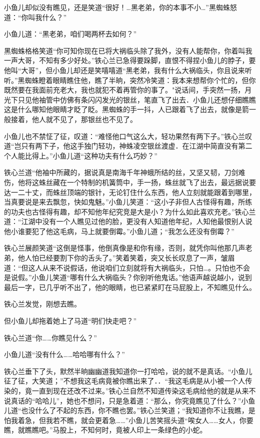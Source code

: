 \documentclass[12pt,oneside]{book}
\begin{document}
小鱼儿却似没有瞧见，还是笑道``很好！\ldots 黑老弟，你的本事不小\ldots{}''黑蜘蛛怒道：``你叫我什么？''

小鱼儿道：``黑老弟，咱们喝两杯去如何？''

黑蜘蛛格格笑道``你可知你现在已将大祸临头除了我外，没有人能帮你，你着叫我一声大哥，不知有多少好处。''铁心兰已急得要跺脚，直恨不得捏小鱼儿的脖子，要他叫``大哥''，但小鱼儿却还是笑嘻嘻道``黑老弟，我有什么大祸临头，你且说来听听。''黑蜘蛛瞪着眼睛瞧住他，瞧了半晌，突然冷笑道：我本来想帮你个忙的，但你既然要在我面前充老大，我也就犯不着再管你的事了。"说话间，手突然一扬，月光下只见他袖管中仿佛有条闪闪发光的银丝，笔直飞了出去．小鱼儿还想仔细瞧瞧这是什么哪知他眼睛才眨了眨。黑蜘蛛的手一抖，人已跟着飞了出去，就像是箭一般接着，他人就不见了，那银丝也不见了。

小鱼儿也不禁怔了征，叹道：``难怪他口气这么大，轻功果然有两下子。''铁心兰叹道``岂只有两下子，他这手独门轻功，神蛛凌空银丝渡虚．在江湖中简直没有第二个人能比得上。''小鱼儿道``这种功夫有什么巧妙？''

铁心兰道``他袖中所藏的，据说真是南海千年神蛾所结的丝，又坚又韧，刀剑难伤，他将这蛛丝藏在一个特制的机簧筒中，手一扬，蛛丝就飞了出去，最远据说要达一二十丈，而蛛丝顶端的银针，无论钉住什么东西，他人立刻就能跟着到哪里，当真要说是来去飘忽，快如鬼魅。''小鱼儿笑道：``这小子非但人古怪得有趣，所练的功夫也古怪得有趣，却不知他年纪究竞是大是小？为什么如此喜欢充老。''铁心兰道：``江湖中没有一个人瞧见过他的脸，更没有人知道他年纪，人知他最恨别人说他小谁要犯了他这毛病，马上就要倒霉。''小鱼儿道；``我怎么还没有倒霉？''

铁心兰展颜笑道``这倒是怪事，他倒真像是和你有缘，否则，就凭你叫他那几声老弟，他人怕已经要割下你的舌头了。''笑着笑着，突又长长叹息了一声，皱眉道：``但这人从来不说假话，他说咱们立刻就将有大祸临头，只怕\ldots。只怕也不会是说假。''小鱼儿笑道``哪有什么大祸临头？你别听他鬼话。''他语声越说越小，说到最后一字，已几乎听不出了，他的眼睛，也已紧紧盯在马屁股上，不知瞧见什么。

铁心兰发觉，刚想去瞧。

但小鱼儿却拖着她上了马道``明们快走吧？''

铁心兰道``你\ldots\ldots 你瞧见什么？''

小鱼儿道``没有什么\ldots\ldots 哈哈哪有什么？''

铁心兰垂下了头，默然半晌幽幽道我知道你一打哈哈，说的就不是真话。``小鱼儿征了征，大笑道；''不想我这毛病竟被你瞧出来了．．``我这毛病是从小被一个人传染的，竟一直到现在还改不过来。''铁心兰自然不知道传染这毛病给他的就是从来不说真话的``哈哈儿''，她也不想问，只是急着道：``那么，你究竟瞧见了什么？''小鱼儿道``也没什么了不起的东西，你不瞧也罢。''铁心兰笑道；``我知道你不让我瞧，是怕我着急，但我若不瞧，就会更着急\ldots\ldots{}''小鱼儿苦笑摇头道``唉女人\ldots\ldots 女人，你要瞧，就瞧瞧吧。''马股上，不知何时，竟被人印上一条绿色的小蛇。
\end{document}

